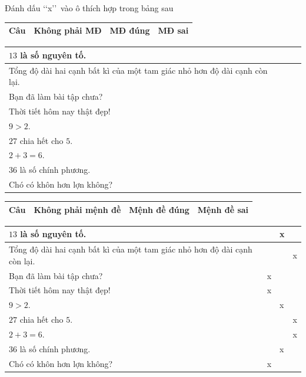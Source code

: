  \begin{vd}%
	Đánh dấu \lq\lq  x\rq\rq\ vào ô thích hợp trong bảng sau
	\begin{center}
		\begin{tabular}{|>{\centering\arraybackslash}m{5.5cm}|>{\centering\arraybackslash}m{2cm}|>{\centering\arraybackslash}m{2cm}|>{\centering\arraybackslash}m{2cm}|}
			\hline
			Câu & Không phải MĐ & MĐ đúng & MĐ sai \\
			\hline
		\end{tabular}
		\begin{tabular}{|>{\raggedright\arraybackslash}m{5.5cm}|>{\centering\arraybackslash}m{2cm}|>{\centering\arraybackslash}m{2cm}|>{\centering\arraybackslash}m{2cm}|}
			$13$ là số nguyên tố. &  &  &  \\
			\hline
			Tổng độ dài hai cạnh bất kì của một tam giác nhỏ hơn độ dài cạnh còn lại. &  &  &  \\
			\hline
			Bạn đã làm bài tập chưa? &  &  &  \\
			\hline
			Thời tiết hôm nay thật đẹp! &  &  &  \\
			\hline
			$9>2$. &  &  &  \\
			\hline
			$27$ chia hết cho $5$. &  &  &  \\
			\hline
			$2+3=6$. &  &  &  \\
			\hline
			$36$ là số chính phương. &  &  &  \\
			\hline
			Chó có khôn hơn lợn không? &  &  &  \\
			\hline
		\end{tabular}
	\end{center}
	\loigiai
	{
		\begin{center}
			\begin{tabular}{|>{\centering\arraybackslash}m{5.5cm}|>{\centering\arraybackslash}m{2cm}|>{\centering\arraybackslash}m{2cm}|>{\centering\arraybackslash}m{2cm}|}
				\hline
				Câu & Không phải mệnh đề & Mệnh đề đúng & Mệnh đề sai \\
				\hline
			\end{tabular}
			\begin{tabular}{|>{\raggedright\arraybackslash}m{5.5cm}|>{\centering\arraybackslash}m{2cm}|>{\centering\arraybackslash}m{2cm}|>{\centering\arraybackslash}m{2cm}|}
				$13$ là số nguyên tố. &  & x &  \\
				\hline
				Tổng độ dài hai cạnh bất kì của một tam giác nhỏ hơn độ dài cạnh còn lại. &  &  & x \\
				\hline
				Bạn đã làm bài tập chưa? & x &  &  \\
				\hline
				Thời tiết hôm nay thật đẹp! & x &  &  \\
				\hline
				$9>2$. &  & x &  \\
				\hline
				$27$ chia hết cho $5$. &  &  & x \\
				\hline
				$2+3=6$. &  &  & x \\
				\hline
				$36$ là số chính phương. &  & x &  \\
				\hline
				Chó có khôn hơn lợn không? & x &  &  \\
				\hline
			\end{tabular}
		\end{center}
	}
\end{vd}
